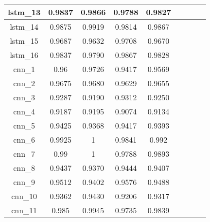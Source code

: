 \begin{table}[p]
\begin{tabular} {|c|c|c|c|c|c|c|c|c| }
        lstm\_13 & 0.9837                       & 0.9866    & 0.9788 & 0.9827 \\ \hline
        lstm\_14 & 0.9875                       & 0.9919    & 0.9814 & 0.9867 \\ \hline
        lstm\_15 & 0.9687                       & 0.9632    & 0.9708 & 0.9670 \\ \hline
        lstm\_16 & 0.9837                       & 0.9790    & 0.9867 & 0.9828 \\ \hline
        cnn\_1   & 0.96                         & 0.9726    & 0.9417 & 0.9569 \\ \hline
        cnn\_2   & 0.9675                       & 0.9680    & 0.9629 & 0.9655 \\ \hline
        cnn\_3   & 0.9287                       & 0.9190    & 0.9312 & 0.9250 \\ \hline
        cnn\_4   & 0.9187                       & 0.9195    & 0.9074 & 0.9134 \\ \hline
        cnn\_5   & 0.9425                       & 0.9368    & 0.9417 & 0.9393 \\ \hline
        cnn\_6   & 0.9925                       & 1         & 0.9841 & 0.992  \\ \hline
        cnn\_7   & 0.99                         & 1         & 0.9788 & 0.9893 \\ \hline
        cnn\_8   & 0.9437                       & 0.9370    & 0.9444 & 0.9407 \\ \hline
        cnn\_9   & 0.9512                       & 0.9402    & 0.9576 & 0.9488 \\ \hline
        cnn\_10  & 0.9362                       & 0.9430    & 0.9206 & 0.9317 \\ \hline
        cnn\_11  & 0.985                        & 0.9945    & 0.9735 & 0.9839 \\ \hline
    \end{tabular}
\end{table}








